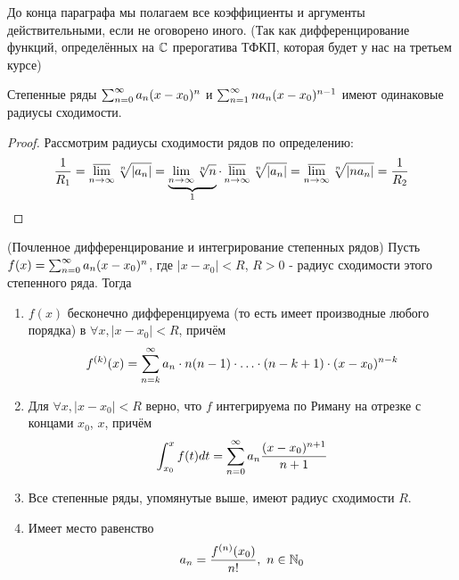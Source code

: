 \begin{note}
	До конца параграфа мы полагаем все коэффициенты и аргументы действительными, если не оговорено иного. (Так как дифференцирование функций, определённых на $\mathbb{C}$ прерогатива ТФКП, которая будет у нас на третьем курсе)
\end{note}

\begin{lemma}
	Степенные ряды $\sum_{n = 0}^\infty a_n(x - x_0)^n$ и $\sum_{n = 1}^\infty na_n(x - x_0)^{n - 1}$ имеют одинаковые радиусы сходимости.
\end{lemma}

\begin{proof}
	Рассмотрим радиусы сходимости рядов по определению:
	\[
		\frac{1}{R_1}=\varlimsup\limits_{n \to \infty} \sqrt[n]{|a_n|} = \underbrace{\lim\limits_{n \to \infty} \sqrt[n]{n}}_{1} \cdot \varlimsup\limits_{n \to \infty} \sqrt[n]{|a_n|} = \varlimsup\limits_{n \to \infty} \sqrt[n]{|na_n|} = \frac{1}{R_2}
	\]
\end{proof}

\begin{theorem} (Почленное дифференцирование и интегрирование степенных рядов)
	Пусть $f(x) = \sum_{n = 0}^\infty a_n(x - x_0)^n$, где $|x - x_0| < R$, $R > 0$ - радиус сходимости этого степенного ряда. Тогда
	\begin{enumerate}
		\item $f(x)$ бесконечно дифференцируема (то есть имеет производные любого порядка) в $\forall x, |x - x_0| < R$, причём
		\[
			f^{(k)}(x) = \sum\limits_{n = k}^\infty a_n \cdot n(n - 1) \cdot \ldots \cdot (n - k + 1) \cdot (x - x_0)^{n - k}
		\]
		
		\item Для $\forall x, |x - x_0| < R$ верно, что $f$ интегрируема по Риману на отрезке с концами $x_0$, $x$, причём
		\[
			\int_{x_0}^x f(t)dt = \sum\limits_{n = 0}^\infty a_n \frac{(x - x_0)^{n + 1}}{n + 1}
		\]
		
		\item Все степенные ряды, упомянутые выше, имеют радиус сходимости $R$.
		
		\item Имеет место равенство
		\[
			a_n = \frac{f^{(n)}(x_0)}{n!},\ n \in \mathbb{N}_0
		\]
	\end{enumerate}
\end{theorem}

